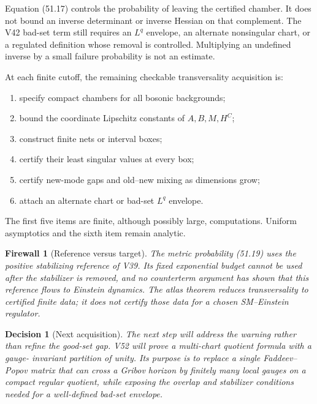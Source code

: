 \documentclass[11pt]{article}
\newtheorem{firewall}[theorem]{Firewall}
\newtheorem{decision}[theorem]{Decision}
\begin{document}
\begin{warning}
\label{warn:v11v51-bad-integrand}
Equation (51.17) controls the probability of leaving the certified
chamber.  It does not bound an inverse determinant or inverse Hessian
on that complement.  The V42 bad-set term still requires an
\(L^q\) envelope, an alternate nonsingular chart, or a regulated
definition whose removal is controlled.  Multiplying an undefined
inverse by a small failure probability is not an estimate.
\end{warning}

\begin{ledger}
\label{led:v11v51-computations}
At each finite cutoff, the remaining checkable transversality
acquisition is:
\begin{enumerate}
\item specify compact chambers for all bosonic backgrounds;
\item bound the coordinate Lipschitz constants of \(A,B,M,H^C\);
\item construct finite nets or interval boxes;
\item certify their least singular values at every box;
\item certify new-mode gaps and old--new mixing as dimensions grow;
\item attach an alternate chart or bad-set \(L^q\) envelope.
\end{enumerate}
The first five items are finite, although possibly large, computations.
Uniform asymptotics and the sixth item remain analytic.
\end{ledger}

\begin{firewall}[Reference versus target]
\label{fire:v11v51-target}
The metric probability (51.19) uses the positive stabilizing reference
of V39.  Its fixed exponential budget cannot be used after the
stabilizer is removed, and no counterterm argument has shown that this
reference flows to Einstein dynamics.  The atlas theorem reduces
transversality to certified finite data; it does not certify those data
for a chosen SM--Einstein regulator.
\end{firewall}

\begin{decision}[Next acquisition]
\label{dec:v11v51-next}
The next step will address the warning rather than refine the good-set
gap.  V52 will prove a multi-chart quotient formula with a gauge-
invariant partition of unity.  Its purpose is to replace a single
Faddeev--Popov matrix that can cross a Gribov horizon by finitely many
local gauges on a compact regular quotient, while exposing the overlap
and stabilizer conditions needed for a well-defined bad-set envelope.
\end{decision}
\end{document}
